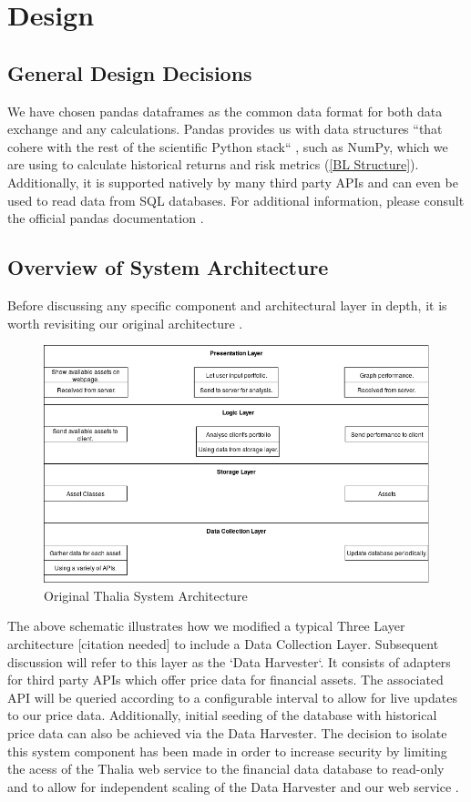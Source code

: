 \documentclass[main.tex]{subfiles}
\begin{document}
\section{Design}

\subsection{General Design Decisions}
We have chosen pandas dataframes \cite{pandas} as the common data format for both data exchange and any calculations. Pandas provides us with data structures ``that cohere with the rest of the scientific Python stack`` \cite{mckinney2011pandas}, such as NumPy, which we are using to calculate historical returns and risk metrics (\ref{BL Structure}). Additionally, it is supported natively by many third party APIs and can even be used to read data from SQL databases. For additional information, please consult the official pandas documentation \cite{pandas}.

\subsection{Overview of System Architecture}

Before discussing any specific component and architectural layer in depth, it is worth revisiting our original architecture \cite{TR}.
\begin{figure}[H]
    \caption{Original Thalia System Architecture \cite{TR}}
	\includegraphics[width=\textwidth]{04Design/04Pictures/architecture_layer_diagram.png}
\end{figure}
The above schematic illustrates how we modified a typical Three Layer architecture [citation needed] to include a Data Collection Layer. Subsequent discussion will refer to this layer as the `Data Harvester`. It consists of adapters for third party APIs which offer price data for financial assets. The associated API will be queried according to a configurable interval to allow for live updates to our price data. Additionally, initial seeding of the database with historical price data can also be achieved via the Data Harvester. The decision to isolate this system component has been made in order to increase security by limiting the acess of the Thalia web service to the financial data database to read-only and to allow for independent scaling of the Data Harvester and our web service \cite{TR}.
\end{document}
